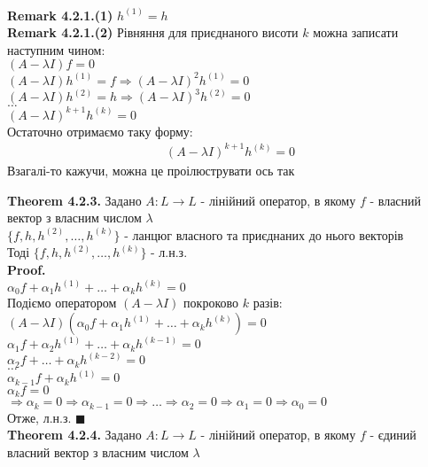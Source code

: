 \documentclass[a4paper, 14pt]{extarticle}
\def\rm#1{\textbf{Remark {#1}}}
\def\th#1{\textbf{Theorem {#1}}}
\def\proof{\textbf{Proof.}\\}
\def\bigline{\vspace{5mm}\\}
\def\qed{$\blacksquare$}
\begin{document}
\\
\rm{4.2.1.(1)} $h^{(1)} = h$
\bigline
\rm{4.2.1.(2)} Рівняння для приєднаного висоти $k$ можна записати наступним чином:\\
$(A-\lambda I)f = 0$\\
$(A-\lambda I)h^{(1)} = f \Rightarrow (A-\lambda I)^2 h^{(1)} = 0$\\
$(A-\lambda I)h^{(2)} = h \Rightarrow (A-\lambda I)^3 h^{(2)} = 0$\\
$\dots$\\
$(A-\lambda I)^{k+1}h^{(k)} = 0$\\
Остаточно отримаємо таку форму:
\begin{align*}
(A-\lambda I)^{k+1}h^{(k)} = 0
\end{align*}
Взагалі-то кажучи, можна це проілюструвати ось так
\begin{figure}[H]
\centering
{}
\end{figure}
\th{4.2.3.} Задано $A: L \to L$ - лінійний оператор, в якому $f$ - власний вектор з власним числом $\lambda$\\
$\{f,h,h^{(2)},\dots,h^{(k)}\}$ - ланцюг власного та приєднаних до нього векторів\\
Тоді $\{f,h,h^{(2)},\dots,h^{(k)}\}$ - л.н.з.\\
\proof
$\alpha_0 f + \alpha_1 h^{(1)} + \dots + \alpha_k h^{(k)} = 0$\\
Подіємо оператором $(A-\lambda I)$ покроково $k$ разів:\\
$(A-\lambda I)(\alpha_0 f + \alpha_1 h^{(1)} + \dots + \alpha_k h^{(k)}) = 0$\\
$\alpha_1 f + \alpha_2 h^{(1)} + \dots + \alpha_k h^{(k-1)} = 0$\\
$\alpha_2 f + \dots + \alpha_k h^{(k-2)} = 0$\\
$\dots$\\
$\alpha_{k-1} f + \alpha_k h^{(1)} = 0$\\
$\alpha_k f = 0$\\
$\Rightarrow \alpha_k = 0 \Rightarrow \alpha_{k-1} = 0 \Rightarrow \dots \Rightarrow \alpha_2 = 0 \Rightarrow \alpha_1 = 0 \Rightarrow \alpha_0 = 0$\\
Отже, л.н.з. \qed
\bigline
\th{4.2.4.} Задано $A: L \to L$ - лінійний оператор, в якому $f$ - єдиний власний вектор з власним числом $\lambda$\\
\end{document}
